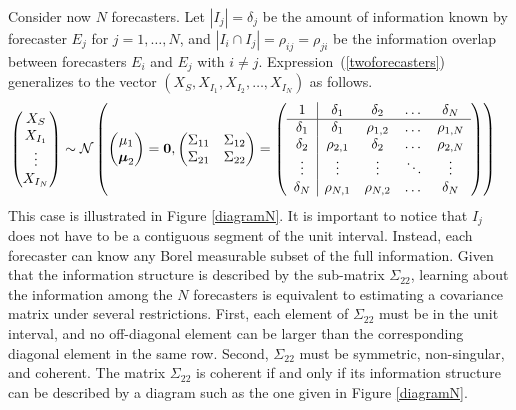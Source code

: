 \documentclass[11pt]{article}
\theoremstyle{definition}
\theoremstyle{definition}
\begin{document}
Consider now $N$ forecasters. Let $|I_j| = \delta_j$ be the amount of 
information known by forecaster $E_j$ for $j = 1, \dots, N$, and 
$|I_i \cap I_j| = \rho_{ij} = \rho_{ji}$ be the information overlap 
between forecasters $E_i$ and $E_j$ with $i \neq j$. 
Expression~(\ref{twoforecasters}) generalizes to the vector 
$(X_{S}, X_{I_1}, X_{I_2}, \dots, X_{I_N})$ as follows.
\begin{align}
\left(\begin{matrix} X_S \\ X_{I_1}\\ \vdots \\ X_{I_N} \end{matrix}\right) &\sim \mathcal{N}\left( \left(\begin{matrix} 
\mu_1 \\ \boldsymbol{\mu}_2
 \end{matrix}\right) =
 \boldsymbol{0}, \left(\begin{matrix} 
\Sigma_{11} & \Sigma_{12}\\
\Sigma_{21} & \Sigma_{22}\\
 \end{matrix}\right) 
 =
 \left(\begin{array}{c | c c cc }
1 & \delta_1 & \delta_2 & \dots & \delta_N  \\ \hline
\delta_1 & \delta_1 &\rho_{1,2} & \dots & \rho_{1,N}   \\ 
\delta_2 & \rho_{2,1} & \delta_2 & \dots & \rho_{2,N}  \\ 
\vdots & \vdots & \vdots & \ddots & \vdots  \\ 
\delta_N & \rho_{N,1} & \rho_{N,2} & \dots & \delta_N\\ 
 \end{array}\right)\right)  \label{Nforecasters}
\end{align}
This case is illustrated in Figure \ref{diagramN}.  It is important 
to notice that $I_j$ does not have to be a contiguous segment of 
the unit interval.  Instead, each forecaster can know any Borel measurable 
subset of the full information.  Given that the information structure 
is described by the sub-matrix $\Sigma_{22}$, learning about the 
information among the $N$ forecasters is equivalent to estimating 
a covariance matrix under several restrictions.  First, each element 
of $\Sigma_{22}$ must be in the unit interval, and no off-diagonal 
element can be larger than the corresponding diagonal element in 
the same row. Second, $\Sigma_{22}$ must be symmetric, non-singular, 
and coherent. The matrix $\Sigma_{22}$ is coherent if and only if 
its information structure can be described by a diagram such as 
the one given in Figure \ref{diagramN}. 
\end{document}
